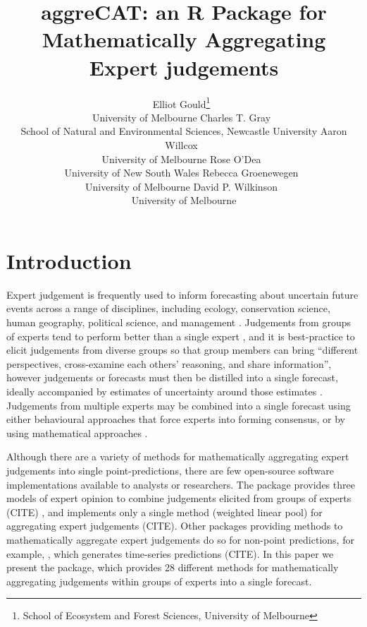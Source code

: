 \documentclass[article]{jss}
\author{Elliot
Gould\footnote{School of Ecosystem and Forest Sciences, University of
  Melbourne}~\orcidlink{0000-0002-6585-538X}\\University of
Melbourne \And Charles T. Gray~\orcidlink{00000-0002-9978-011X}\\School
of Natural and Environmental Sciences, Newcastle University \AND Aaron
Willcox~\orcidlink{https://orcid.org/0000-0003-2536-2596}\\University of
Melbourne \And Rose O'Dea~\orcidlink{0000-0001-8177-5075}\\University of
New South Wales \AND Rebecca
Groenewegen~\orcidlink{https://orcid.org/0000-0001-9177-8536}\\University
of Melbourne \And David P.
Wilkinson~\orcidlink{0000-0002-9560-6499}\\University of Melbourne}
\title{aggreCAT: an R Package for Mathematically Aggregating Expert
judgements}
\begin{document}
\maketitle
\ifdefined\Shaded\renewenvironment{Shaded}{\begin{tcolorbox}[borderline west={3pt}{0pt}{shadecolor}, breakable, enhanced, frame hidden, sharp corners, interior hidden, boxrule=0pt]}{\end{tcolorbox}}\fi

\hypertarget{sec-introduction}{%
\section{Introduction}\label{sec-introduction}}

Expert judgement is frequently used to inform forecasting about
uncertain future events across a range of disciplines, including
ecology, conservation science, human geography, political science, and
management \citep{Sutherland2018}. Judgements from groups of experts
tend to perform better than a single expert \citep{Goossens2008}, and it
is best-practice to elicit judgements from diverse groups so that group
members can bring ``different perspectives, cross-examine each others'
reasoning, and share information'', however judgements or forecasts must
then be distilled into a single forecast, ideally accompanied by
estimates of uncertainty around those estimates \citep{Hanea2021}.
Judgements from multiple experts may be combined into a single forecast
using either behavioural approaches that force experts into forming
consensus, or by using mathematical approaches \citep{Goossens2008}.

Although there are a variety of methods for mathematically aggregating
expert judgements into single point-predictions, there are few
open-source software implementations available to analysts or
researchers. The  \citet{R} package provides
three models of expert opinion to combine judgements elicited from
groups of experts (CITE) , and  implements only a single
method (weighted linear pool) for aggregating expert judgements (CITE).
Other  packages providing methods to mathematically
aggregate expert judgements do so for non-point predictions, for
example, , which generates time-series predictions (CITE). In
this paper we present the  package, which provides 28
different methods for mathematically aggregating judgements within
groups of experts into a single forecast.
\end{document}
